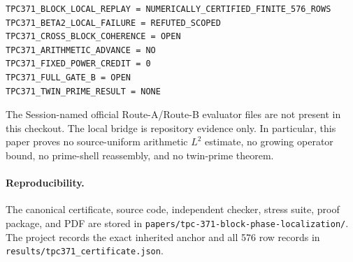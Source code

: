 \documentclass[10pt]{article}
\begin{document}
\begin{verbatim}
TPC371_BLOCK_LOCAL_REPLAY = NUMERICALLY_CERTIFIED_FINITE_576_ROWS
TPC371_BETA2_LOCAL_FAILURE = REFUTED_SCOPED
TPC371_CROSS_BLOCK_COHERENCE = OPEN
TPC371_ARITHMETIC_ADVANCE = NO
TPC371_FIXED_POWER_CREDIT = 0
TPC371_FULL_GATE_B = OPEN
TPC371_TWIN_PRIME_RESULT = NONE
\end{verbatim}

The Session-named official Route-A/Route-B evaluator files are not present in
this checkout.  The local bridge is repository evidence only.  In particular,
this paper proves no source-uniform arithmetic \(L^2\) estimate, no growing
operator bound, no prime-shell reassembly, and no twin-prime theorem.

\paragraph{Reproducibility.}

The canonical certificate, source code, independent checker, stress suite,
proof package, and PDF are stored in
\texttt{papers/tpc-371-block-phase-localization/}.  The project records the
exact inherited anchor and all 576 row records in
\texttt{results/tpc371\_certificate.json}.
\end{document}
